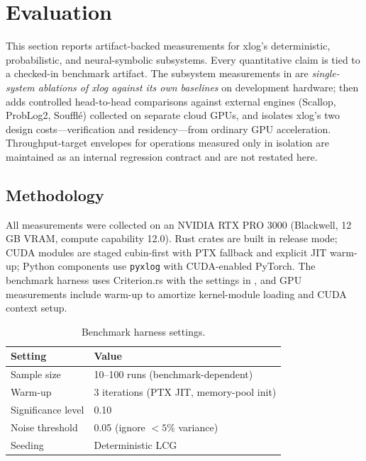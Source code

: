 \section{Evaluation}\label{sec:eval}

This section reports artifact-backed measurements for xlog's deterministic, probabilistic, and neural-symbolic subsystems. Every quantitative claim is tied to a checked-in benchmark artifact. The subsystem measurements in  are \emph{single-system ablations of xlog against its own baselines} on development hardware;  then adds controlled head-to-head comparisons against external engines (Scallop, ProbLog2, Soufflé) collected on separate cloud GPUs, and  isolates xlog's two design costs---verification and residency---from ordinary GPU acceleration. Throughput-target envelopes for operations measured only in isolation are maintained as an internal regression contract and are not restated here.

\subsection{Methodology}

All measurements were collected on an NVIDIA RTX PRO 3000 (Blackwell, 12\,GB VRAM, compute capability 12.0). Rust crates are built in release mode; CUDA modules are staged cubin-first with PTX fallback and explicit JIT warm-up; Python components use \texttt{pyxlog} with CUDA-enabled PyTorch. The benchmark harness uses Criterion.rs with the settings in , and GPU measurements include warm-up to amortize kernel-module loading and CUDA context setup.

\begin{table}[htbp]
  \centering
  \caption{Benchmark harness settings.}
  \label{tab:stat-protocol}
  \small
  \begin{tabular}{@{}ll@{}}
    \toprule
    \textbf{Setting} & \textbf{Value} \\
    \midrule
    Sample size       & 10--100 runs (benchmark-dependent) \\
    Warm-up           & 3 iterations (PTX JIT, memory-pool init) \\
    Significance level & 0.10 \\
    Noise threshold   & 0.05 (ignore ${<}5\%$ variance) \\
    Seeding           & Deterministic LCG \\
    \bottomrule
  \end{tabular}
\end{table}

